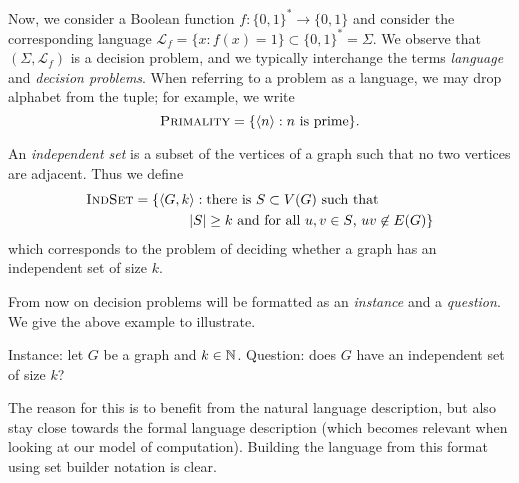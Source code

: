 Now, we consider a Boolean function $f: \{0,1\}^* \to \{0,1\}$ and consider the corresponding language $\mathcal L_f = \{x: f(x) = 1\} \subset \{0,1\}^* = \Sigma$. We observe that $(\Sigma, \mathcal L_f)$ is a decision problem, and we typically interchange the terms \emph{language} and \emph{decision problems}. When referring to a problem as a language, we may drop alphabet from the tuple; for example, we write
\[
  \textsc{Primality} = \{ \langle n \rangle: \text{$n$ is prime} \}.   
\]

\begin{example}
  An \emph{independent set} is a subset of the vertices of a graph such that no two vertices are adjacent. Thus we define
  \begin{align*}
    \textsc{IndSet} &= \{\langle G, k \rangle: \text{there is $S \subset V(G)$ such that} \\
    &\qquad\qquad \text{$\lvert S \rvert \geq k$ and for all $u, v \in S$, $uv \not\in E(G)$}\}
  \end{align*}
  which corresponds to the problem of deciding whether a graph has an independent set of size $k$. 
\end{example}

From now on decision problems will be formatted as an \emph{instance} and a \emph{question}. We give the above example to illustrate.

\begin{problem} 
  Instance: let $G$ be a graph and $k \in \mathbb N$. \newline
  Question: does $G$ have an independent set of size $k$? 
\end{problem}

The reason for this is to benefit from the natural language description, but also stay close towards the formal language description (which becomes relevant when looking at our model of computation). Building the language from this format using set builder notation is clear. 